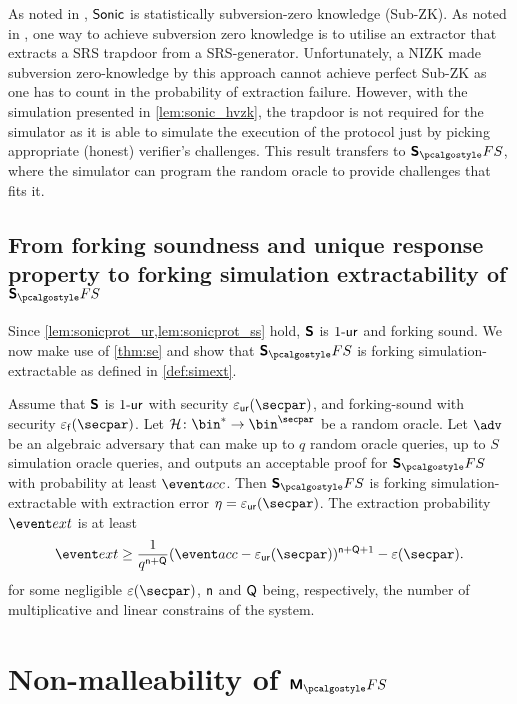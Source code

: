 \documentclass[runningheads,11pt]{llncs}
\begin{document}
\begin{remark} 
  As noted in \cite{CCS:MBKM19}, ${\textnormal{\textsf{Sonic}}}$ is statistically subversion-zero
  knowledge (Sub-ZK). As noted in \cite{AC:ABLZ17}, one way to achieve
  subversion zero knowledge is to utilise an extractor that extracts a SRS
  trapdoor from a SRS-generator. Unfortunately, a NIZK made subversion
  zero-knowledge by this approach cannot achieve perfect Sub-ZK as one has to
  count in the probability of extraction failure. However, with the simulation
  presented in \cref{lem:sonic_hvzk}, the trapdoor is not required for the
  simulator as it is able to simulate the execution of the protocol just by
  picking appropriate (honest) verifier's challenges. This result transfers to
  $\sonicprotfs$, where the simulator can program the random oracle to provide
  challenges that fits it.
\end{remark}

\subsection{From forking soundness and unique response property to forking
  simulation extractability of $\sonicprotfs$}
Since \cref{lem:sonicprot_ur,lem:sonicprot_ss} hold, $\bm{\mathsf{S}}$ is ${1\text{-}\mathsf{ur}}$
and forking sound. We now make use
of \cref{thm:se} and show that $\sonicprotfs$ is forking simulation-extractable as defined in \cref{def:simext}.

\begin{corollary}
  \label{thm:sonicprotfs_se}
  Assume that $\bm{\mathsf{S}}$ is ${1\text{-}\mathsf{ur}}$ with security $\epsur(\secpar)$, and
  forking-sound with security $\epsss(\secpar)$. Let
  $\ro\colon \bin^* \to \bin^\secpar$ be a random oracle. Let $\advse$ be an
  algebraic adversary that can make up to $q$ random oracle queries, up to $S$
  simulation oracle queries, and outputs an acceptable proof for $\sonicprotfs$
  with probability at least $\accProb$. Then $\sonicprotfs$ is forking
  simulation-extractable with extraction error $\eta = \epsur(\secpar)$. The
  extraction probability $\extProb$ is at least
\[
		\extProb  \geq \frac{1}{q^{\multconstr + \linconstr}} (\accProb - \epsur(\secpar))^{\multconstr +
		\linconstr + 1} - \eps(\secpar).
	\]
	for some negligible $\eps(\secpar)$, $\mathsf{n}$ and $\mathsf{Q}$ being,
  respectively, the number of multiplicative and linear constrains of the system.
\end{corollary}

\section{Non-malleability of $\marlinprotfs$}
\end{document}
